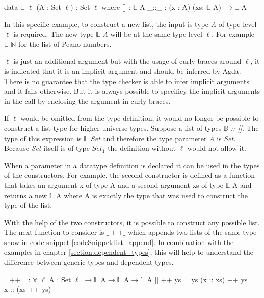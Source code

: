 \begin{codesnippet}[mathescape=true, caption={Definition of the list datatype in Agda}, label={codeSnippet:list_datatype}]
data $\mathbb{L}$ {$\ell$} (A : Set $\ell$) : Set $\ell$ where
  [] : $\mathbb{L}$ A
  _::_ : (x : A) (xs: $\mathbb{L}$ A) $\rightarrow \mathbb{L}$ A
\end{codesnippet}

In this specific example, to construct a new list, the input is type \emph{A} of type level $\ell$  is required. The new type $\mathbb{L}$ \emph{A} will be at the same type level $\ell$.
For example $\mathbb{L}$ $\mathbb{N}$ for the list of Peano numbers.

$\ell$ is just an additional argument but with the usage of curly braces around $\ell$, it is indicated that it is an implicit argument and should be inferred by Agda.
There is no guarantee that the type checker is able to infer implicit arguments and it fails otherwise.
But it is always possible to specificy the implicit arguments in the call by enclosing the argument in curly braces\cite{norell:deptyped}.

If $\ell$ would be omitted from the type definition, it would no longer be possible to construct a list type for higher universe types.
Suppose a list of types \emph{$\mathbb{B}$ :: []}. 
The type of this expression is \emph{$\mathbb{L}$ Set} and therefore the type parameter \emph{A} is \emph{Set}. 
Because \emph{Set} itself is of type $Set_1$ the definition without $\ell$ would not allow it.

When a parameter in a datatype definition is declared it can be used in the types of the constructors. 
For example, the second constructor is defined as a function that takes an argument x of type A and a second argument xs of type $\mathbb{L}$ A and returns a new $\mathbb{L}$ A where A is exactly the type that was used to construct the type of the list.

With the help of the two constructors, it is possible to construct any possible list. 
The next function to consider is $\_++\_$ which appends two lists of the same type show in code snippet \ref{codeSnippet:list_append}. 
In combination with the examples in chapter \ref{section:dependent_types}, this will help to understand the difference between generic types and dependent types.

\begin{codesnippet}[mathescape=true, caption={Definition of the list append function in Agda}, label={codeSnippet:list_append}]
_++_ : $\forall$ {$\ell$} {A : Set $\ell$} $\rightarrow \mathbb{L}$ A$\rightarrow \mathbb{L}$ A$\rightarrow \mathbb{L}$ A
  []        ++ ys = ys
  (x :: xs) ++ ys = x :: (xs ++ ys)
\end{codesnippet}

